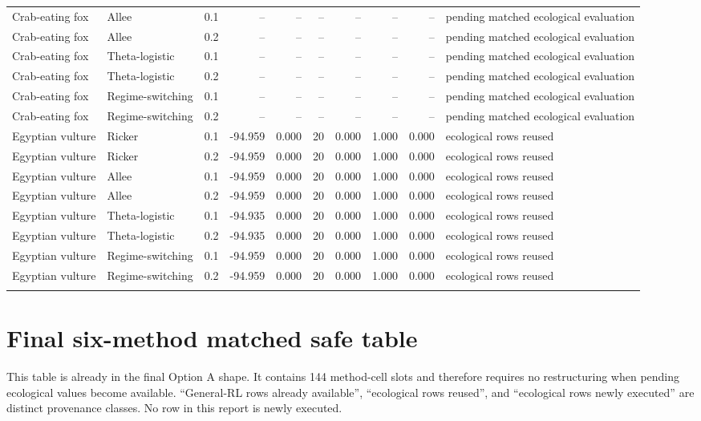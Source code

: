 \documentclass[10pt]{article}
\begin{document}
\begin{landscape}
\begin{center}
\begin{longtable}{@{}lllrrrrrrp{4.5cm}@{}}
\addlinespace[1pt]
Crab-eating fox & Allee & 0.1 & -- & -- & -- & -- & -- & -- & pending matched ecological evaluation \\
Crab-eating fox & Allee & 0.2 & -- & -- & -- & -- & -- & -- & pending matched ecological evaluation \\
\addlinespace[1pt]
Crab-eating fox & Theta-logistic & 0.1 & -- & -- & -- & -- & -- & -- & pending matched ecological evaluation \\
Crab-eating fox & Theta-logistic & 0.2 & -- & -- & -- & -- & -- & -- & pending matched ecological evaluation \\
\addlinespace[1pt]
Crab-eating fox & Regime-switching & 0.1 & -- & -- & -- & -- & -- & -- & pending matched ecological evaluation \\
Crab-eating fox & Regime-switching & 0.2 & -- & -- & -- & -- & -- & -- & pending matched ecological evaluation \\
\addlinespace[1pt]
Egyptian vulture & Ricker & 0.1 & -94.959 & 0.000 & 20 & 0.000 & 1.000 & 0.000 & ecological rows reused \\
Egyptian vulture & Ricker & 0.2 & -94.959 & 0.000 & 20 & 0.000 & 1.000 & 0.000 & ecological rows reused \\
\addlinespace[1pt]
Egyptian vulture & Allee & 0.1 & -94.959 & 0.000 & 20 & 0.000 & 1.000 & 0.000 & ecological rows reused \\
Egyptian vulture & Allee & 0.2 & -94.959 & 0.000 & 20 & 0.000 & 1.000 & 0.000 & ecological rows reused \\
\addlinespace[1pt]
Egyptian vulture & Theta-logistic & 0.1 & -94.935 & 0.000 & 20 & 0.000 & 1.000 & 0.000 & ecological rows reused \\
Egyptian vulture & Theta-logistic & 0.2 & -94.935 & 0.000 & 20 & 0.000 & 1.000 & 0.000 & ecological rows reused \\
\addlinespace[1pt]
Egyptian vulture & Regime-switching & 0.1 & -94.959 & 0.000 & 20 & 0.000 & 1.000 & 0.000 & ecological rows reused \\
Egyptian vulture & Regime-switching & 0.2 & -94.959 & 0.000 & 20 & 0.000 & 1.000 & 0.000 & ecological rows reused \\
\addlinespace[1pt]
\end{longtable}
\end{center}
\end{landscape}

\section{Final six-method matched safe table}
This table is already in the final Option A shape. It contains 144 method-cell slots and therefore
requires no restructuring when pending ecological values become available. ``General-RL rows
already available'', ``ecological rows reused'', and ``ecological rows newly executed'' are distinct
provenance classes. No row in this report is newly executed.
\end{document}
